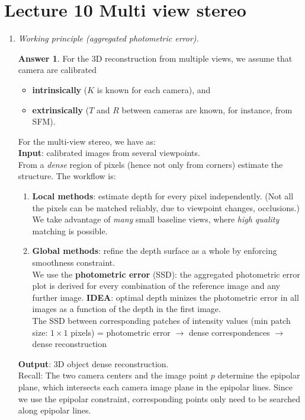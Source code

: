 \documentclass[a4paper,12 pt]{article}
\theoremstyle{definition}
\theoremstyle{remark}
\theoremstyle{definition}
\theoremstyle{definition}
\theoremstyle{definition}
\theoremstyle{definition}
\theoremstyle{remark}
\theoremstyle{remark}
\theoremstyle{definition}
\theoremstyle{definition}
\newtheorem*{answer}{Answer}
\begin{document}
\section*{Lecture 10 Multi view stereo}
\begin{enumerate}
\item \textit{Working principle (aggregated photometric error). }
\begin{answer}
For the 3D reconstruction from multiple views, we assume that camera are calibrated
\begin{itemize}
\item \textbf{intrinsically} ($K$ is known for each camera), and
\item \textbf{extrinsically} ($T$ and $R$ between cameras are known, for instance, from SFM).
\end{itemize}
For the multi-view stereo, we have as:\\
\textbf{Input}: calibrated images from several viewpoints. \\
From a \textit{dense} region of pixels (hence not only from corners) estimate the structure. The workflow is:
\begin{enumerate}
\item \textbf{Local methods}: estimate depth for every pixel independently. (Not all the pixels can be matched reliably, due to viewpoint changes, occlusions.)\\
We take advantage of \textit{many} small baseline views, where \textit{high quality} matching is possible. 
\item \textbf{Global methods}: refine the depth surface as a whole by enforcing smoothness constraint.\\
We use the \textbf{photometric error} (SSD): the aggregated photometric error plot is derived for every combination of the reference image and any further image. \textbf{IDEA}: optimal depth minizes the photometric error in all images as a function of the depth in the first image.\\
The SSD between corresponding patches of intensity values (min patch size: $1\times 1$ pixels) = photometric error $\rightarrow$ dense correspondences $\rightarrow$ dense reconstruction
\end{enumerate}
\textbf{Output}: 3D object dense reconstruction. \\
Recall: The two camera centers and the image point $p$ determine the epipolar plane, which intersects each camera image plane in the epipolar lines. Since we use the epipolar constraint, corresponding points only need to be searched along epipolar lines.

\end{answer}
\end{enumerate}
\end{document}
